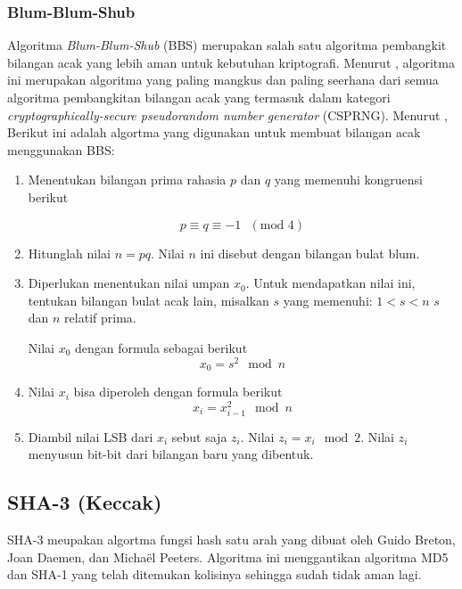 \documentclass[10pt,conference]{IEEEtran}
\theoremstyle{definition}
\begin{document}
\subsubsection{Blum-Blum-Shub}

Algoritma \emph{Blum-Blum-Shub} (BBS) merupakan salah satu algoritma pembangkit bilangan acak yang lebih aman untuk kebutuhan kriptografi. Menurut \cite{b1}, algoritma ini merupakan algoritma yang paling mangkus dan paling seerhana dari semua algoritma pembangkitan bilangan acak yang termasuk dalam kategori \emph{cryptographically-secure pseudorandom number generator} (CSPRNG). Menurut \cite{b1}, Berikut ini adalah algortma yang digunakan untuk membuat bilangan acak menggunakan BBS:

\begin{enumerate}
    \item Menentukan bilangan prima rahasia $p$ dan $q$ yang memenuhi kongruensi berikut

    \begin{equation} \label{eq:bbs1}
        p \equiv q \equiv -1 \text{ }(\text{mod } 4) 
    \end{equation}
    \item Hitunglah nilai $n = pq$. Nilai $n$ ini disebut dengan bilangan bulat blum. 
    \item Diperlukan menentukan nilai umpan $x_0$. Untuk mendapatkan nilai ini, tentukan bilangan bulat acak lain, misalkan $s$ yang memenuhi:
    \subitem $1 < s < n$
    \subitem $s$ dan $n$ relatif prima.

    Nilai $x_0$ dengan formula sebagai berikut 
    \begin{equation} \label{eq:bbs2}
        x_0 = s^2 \mod n
    \end{equation}
    \item Nilai $x_i$ bisa diperoleh dengan formula berikut
    \begin{equation} \label{eq:bbs3}
        x_i = x_{i-1}^2 \mod n
    \end{equation}
    \item Diambil nilai LSB dari $x_i$ sebut saja $z_i$. Nilai $z_i = x_i \mod 2$. Nilai $z_i$ menyusun bit-bit dari bilangan baru yang dibentuk.
\end{enumerate}

\subsection{SHA-3 (Keccak)}
SHA-3 meupakan algortma fungsi hash satu arah yang dibuat oleh Guido Breton, Joan Daemen, dan Michaël Peeters. Algoritma ini menggantikan algoritma MD5 dan SHA-1 yang telah ditemukan kolisinya sehingga sudah tidak aman lagi.
\end{document}
